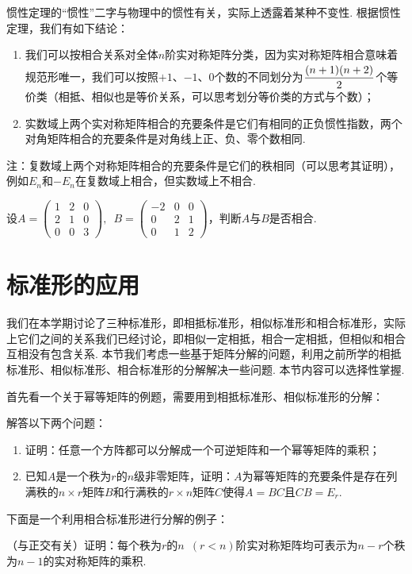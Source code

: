 惯性定理的``惯性''二字与物理中的惯性有关，实际上透露着某种不变性. 根据惯性定理，我们有如下结论：
\begin{enumerate}
    \item 我们可以按相合关系对全体$n$阶实对称矩阵分类，因为实对称矩阵相合意味着规范形唯一，我们可以按照$+1$、$-1$、0个数的不同划分为$\vphantom{\cfrac{n+1}{2}}\dfrac{(n+1)(n+2)}{2}$个等价类（相抵、相似也是等价关系，可以思考划分等价类的方式与个数）；

    \item 实数域上两个实对称矩阵相合的充要条件是它们有相同的正负惯性指数，两个对角矩阵相合的充要条件是对角线上正、负、零个数相同.
\end{enumerate}
注：复数域上两个对称矩阵相合的充要条件是它们的秩相同（可以思考其证明），例如$E_n$和$-E_n$在复数域上相合，但实数域上不相合.
\begin{example}{}{}
    设$A=\begin{pmatrix}
            1 & 2 & 0 \\ 2 & 1 & 0 \\ 0 & 0 & 3
        \end{pmatrix},\enspace B=\begin{pmatrix}
            -2 & 0 & 0 \\ 0 & 2 & 1 \\ 0 & 1 & 2
        \end{pmatrix}$，判断$A$与$B$是否相合.
\end{example}

\section{标准形的应用}

我们在本学期讨论了三种标准形，即相抵标准形，相似标准形和相合标准形，实际上它们之间的关系我们已经讨论，即相似一定相抵，相合一定相抵，但相似和相合互相没有包含关系. 本节我们考虑一些基于矩阵分解的问题，利用之前所学的相抵标准形、相似标准形、相合标准形的分解解决一些问题. 本节内容可以选择性掌握.

首先看一个关于幂等矩阵的例题，需要用到相抵标准形、相似标准形的分解：
\begin{example}{}{}
    解答以下两个问题：
    \begin{enumerate}
        \item 证明：任意一个方阵都可以分解成一个可逆矩阵和一个幂等矩阵的乘积；

        \item 已知$A$是一个秩为$r$的$n$级非零矩阵，证明：$A$为幂等矩阵的充要条件是存在列满秩的$n\times r$矩阵$B$和行满秩的$r\times n$矩阵$C$使得$A=BC$且$CB=E_r$.
    \end{enumerate}
\end{example}
下面是一个利用相合标准形进行分解的例子：
\begin{example}{}{}
    （与正交有关）证明：每个秩为$r$的$n\enspace(r<n)$阶实对称矩阵均可表示为$n-r$个秩为$n-1$的实对称矩阵的乘积.
\end{example}

